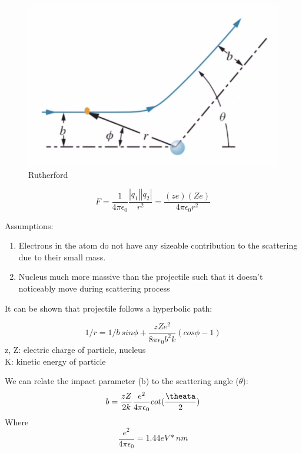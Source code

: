 \documentclass[class=article,crop=false]{standalone}
\begin{document}
\begin{figure}[h!]
	\centering
	\includegraphics[width=.5\linewidth]{./Images/rscatter.png}
	\caption{Rutherford}
\end{figure}

$$ F = \frac{1}{4\pi \epsilon_0} \frac{|q_1||q_2|}{r^2} = \frac{(ze)(Ze)}{4\pi \epsilon_0r^2} $$

Assumptions:
\begin{enumerate}
	\item Electrons in the atom do not have any sizeable contribution to the scattering due to their small mass.
	\item Nucleus much more massive than the projectile such that it doesn't noticeably move during scattering process
\end{enumerate}

It can be shown that projectile follows a hyperbolic path:

$$ 1/r = 1/b\ sin \phi + \frac{zZe^2}{8\pi\epsilon_0b^2k}(cos\phi-1) $$
z, Z: electric charge of particle, nucleus \\
K: kinetic energy of particle

We can relate the impact parameter (b) to the scattering angle ($\theta$):
$$ b = \frac{zZ}{2k} \frac{e^2}{4\pi\epsilon_0} cot(\frac{\theata}{2}) $$
Where 
$$ \frac{e^2}{4\pi\epsilon_0} = 1.44 eV*nm $$
\end{document}
